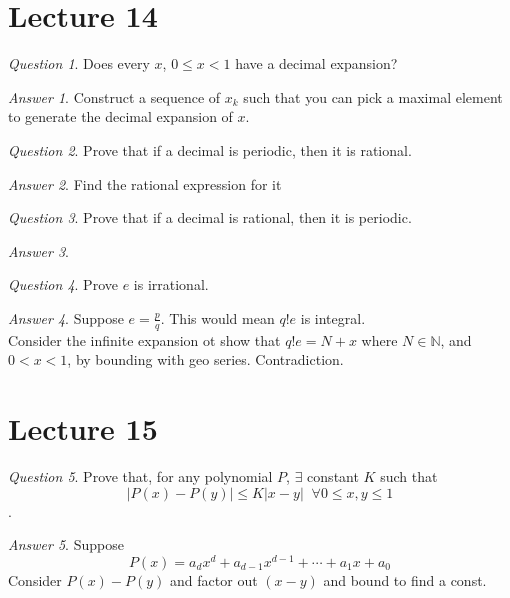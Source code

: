\documentclass[]{article}
\def\naturals{\mathbb{N}}
\theoremstyle{remark}
\theoremstyle{qnstyle}
\newtheorem{question}{Question}
\theoremstyle{answerstyle}
\newtheorem*{answer}{Answer}
\begin{document}
\section* {Lecture 14}

\begin{question}
    Does every $x$, $0 \leq x < 1$ have a decimal expansion?
\end{question}
\begin{answer}
    Construct a sequence of $x_k$ such that you can pick a maximal element to
    generate the decimal expansion of $x$.
\end{answer}

\begin{question}
    Prove that if a decimal is periodic, then it is rational.
\end{question}
\begin{answer}
    Find the rational expression for it
\end{answer}

\begin{question}
    Prove that if a decimal is rational, then it is periodic.
\end{question}
\begin{answer}
    
\end{answer}

\begin{question}
    Prove $e$ is irrational.
\end{question}
\begin{answer}
    Suppose $e = \frac{p}{q}$. This would mean $q!e$ is integral.\\
    Consider the infinite expansion ot show that $q!e = N + x$ where $N \in \naturals$,
    and $0 < x < 1$, by bounding with geo series. Contradiction.
\end{answer}





\section* {Lecture 15}

\begin{question}
    Prove that, for any polynomial $P$, $\exists$ constant $K$ such that
        $$|P(x) - P(y)| \leq K|x - y| \;\; \forall 0 \leq x,y \leq 1$$.
\end{question}
\begin{answer}
    Suppose
        $$P(x) = a_d x^d + a_{d-1} x^{d-1} + \cdots + a_1x + a_0$$
    Consider $P(x) - P(y)$ and factor out $(x-y)$ and bound to find a const.
\end{answer}
\end{document}
